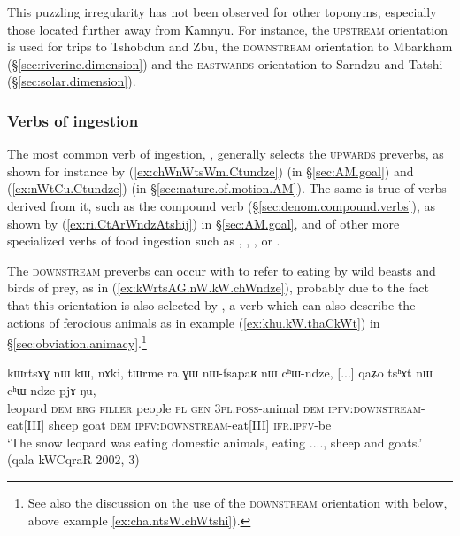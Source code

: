 This puzzling irregularity has not been observed for other toponyms, especially those located further away from Kamnyu. For instance, the \textsc{upstream} orientation is used for trips to Tshobdun and Zbu, the \textsc{downstream} orientation to Mbarkham (§\ref{sec:riverine.dimension}) and the \textsc{eastwards} orientation to Sarndzu and Tatshi (§\ref{sec:solar.dimension}).


\subsubsection{Verbs of ingestion} \label{sec:preverb.ingestion}
The most common verb of ingestion, , generally selects the \textsc{upwards} preverbs, as shown for instance by (\ref{ex:chWnWtsWm.Ctundze}) (in §\ref{sec:AM.goal}) and (\ref{ex:nWtCu.Ctundze}) (in §\ref{sec:nature.of.motion.AM}). The same is true of verbs derived from it, such as the compound verb  (§\ref{sec:denom.compound.verbs}), as shown by (\ref{ex:ri.CtArWndzAtshij}) in §\ref{sec:AM.goal}, and of other more specialized verbs of food ingestion such as , , ,  or .

The \textsc{downstream} preverbs can occur with  to refer to eating by wild beasts and birds of prey, as in (\ref{ex:kWrtsAG.nW.kW.chWndze}), probably due to the fact that this orientation is also selected by , a verb which can also describe the actions of ferocious animals as in example (\ref{ex:khu.kW.thaCkWt}) in §\ref{sec:obviation.animacy}.\footnote{See also the discussion on the use of the \textsc{downstream} orientation with  below, above example \ref{ex:cha.ntsW.chWtshi}).}

\begin{exe}
\ex \label{ex:kWrtsAG.nW.kW.chWndze}
\gll kɯrtsɤɣ nɯ kɯ, nɤki, tɯrme ra ɣɯ nɯ-fsapaʁ nɯ cʰɯ-ndze, [...] qaʑo tsʰɤt nɯ cʰɯ-ndze pjɤ-ŋu, \\
leopard \textsc{dem} \textsc{erg} \textsc{filler} people \textsc{pl} \textsc{gen} \textsc{3pl}.\textsc{poss}-animal \textsc{dem} \textsc{ipfv}:\textsc{downstream}-eat[III] { } sheep goat \textsc{dem} \textsc{ipfv}:\textsc{downstream}-eat[III] \textsc{ifr}.\textsc{ipfv}-be \\
\glt `The snow leopard was eating domestic animals, eating ...., sheep and goats.' (qala kWCqraR 2002, 3)
\end{exe}

